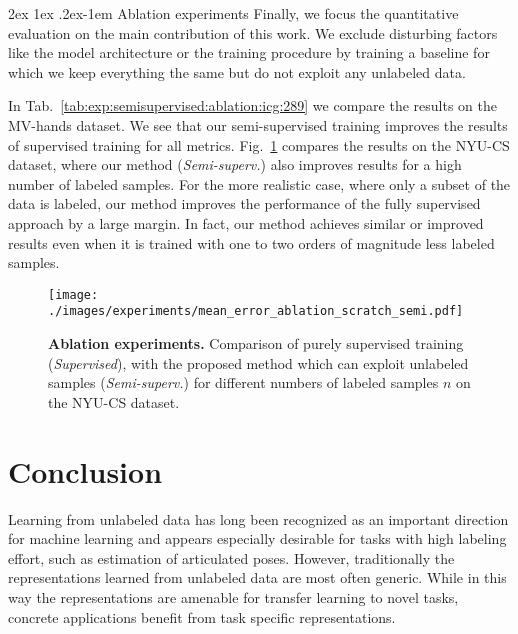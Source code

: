 \documentclass[10pt,twocolumn,letterpaper]{article}
\makeatletter
\renewcommand{\paragraph}{%
  \@startsection{paragraph}{4}%
  {\z@}{2ex \@plus 1ex \@minus .2ex}{-1em}%
  {\normalfont\normalsize\bfseries}%
}
\makeatother
\begin{document}
\paragraph{Ablation experiments}
Finally, we focus the quantitative evaluation on the main contribution of this work.
We exclude disturbing factors like the model architecture 
or the training procedure
by training a baseline for which we keep everything the same 
but do not exploit any unlabeled data.

In Tab.~\ref{tab:exp:semisupervised:ablation:icg:289} we compare the results on the MV-hands dataset.
We see that our semi-supervised training 
improves the results of supervised training for all metrics.
Fig.~\ref{fig:exp:semisupervised:ablation:nyu} compares the results on the NYU-CS dataset,
where our method (\emph{Semi-superv.}) also
improves results for a high number of labeled samples.
For the more realistic case, where only a subset of the data is labeled, 
our method improves the performance of the fully supervised approach by a large margin.
In fact, our method achieves similar or improved results 
even when it is trained with one to two orders of magnitude less labeled samples.

\begin{figure}[t]
  \centering
  \texttt{[image: ./images/experiments/mean\_error\_ablation\_scratch\_semi.pdf]}
  \caption[]{\textbf{Ablation experiments.}
  Comparison of purely supervised training (\emph{Supervised}), 
  with the proposed method which can exploit unlabeled samples (\emph{Semi-superv.})
  for different numbers of labeled samples $n$ on the NYU-CS dataset.
  }
  \label{fig:exp:semisupervised:ablation:nyu}
\end{figure}

\section{Conclusion}
Learning from unlabeled data has long been recognized as an important direction for 
machine learning and appears especially desirable for tasks with high labeling effort, 
such as estimation of articulated poses.
However, traditionally the representations learned from unlabeled data are most often generic.
While in this way the representations are amenable for transfer learning to novel tasks,
concrete applications benefit from task specific representations. 
\end{document}
